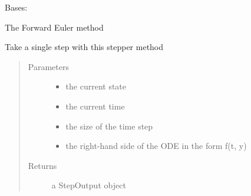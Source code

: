 \documentclass[letterpaper,10pt,english]{sphinxmanual}
\begin{document}

\begin{fulllineitems}
\label{\detokenize{spitfire.time.methods:spitfire.time.methods.ForwardEuler}}
Bases: {\hyperref[\detokenize{spitfire.time.methods:spitfire.time.methods.TimeStepper}]{}}

The Forward Euler method

\begin{fulllineitems}
\label{\detokenize{spitfire.time.methods:spitfire.time.methods.ForwardEuler.single_step}}
Take a single step with this stepper method
\begin{quote}\begin{description}
\item[{Parameters}] \leavevmode\begin{itemize}
\item {} 
 \textendash{} the current state

\item {} 
 \textendash{} the current time

\item {} 
 \textendash{} the size of the time step

\item {} 
 \textendash{} the right-hand side of the ODE in the form f(t, y)

\end{itemize}

\item[{Returns}] \leavevmode
a StepOutput object

\end{description}\end{quote}

\end{fulllineitems}


\end{fulllineitems}
\end{document}
